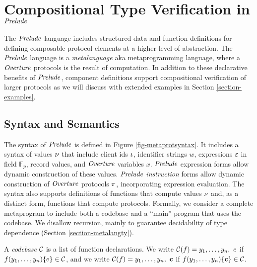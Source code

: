 \section{Compositional Type Verification in $\mathit{Prelude}$}
\label{section-metalang}

The $\mathit{Prelude}$ language \cite{skalka-near-ppdp24} includes structured
data and function definitions for defining composable protocol
elements at a higher level of abstraction.  The $\mathit{Prelude}$ language
is a \emph{metalanguage} aka metaprogramming language, where a
$\mathit{Overture}$ protocols is the result of computation. In addition to
these declarative benefits of $\mathit{Prelude}$, component definitions
support compositional verification of larger protocols as we will
discuss with extended examples in Section \ref{section-examples}.

\metaprotsyntaxfig

\subsection{Syntax and Semantics}

The syntax of $\mathit{Prelude}$ is defined in Figure
\ref{fig-metaprotsyntax}.  It includes a syntax of values $\nu$ that
include client ids $\iota$, identifier strings $w$, expressions $\varepsilon$
in field $\mathbb{F}_p$, record values, and $\mathit{Overture}$ variables
$x$. $\mathit{Prelude}$ expression forms allow dynamic construction of these
values. $\mathit{Prelude}$ \emph{instruction} forms allow dynamic
construction of $\mathit{Overture}$ protocols $\pi$, incorporating expression
evaluation. The syntax also supports definitions of functions that
compute values $\nu$ and, as a distinct form, functions that compute
protocols.  Formally, we consider a complete metaprogram to include
both a codebase and a ``main'' program that uses the codebase.
We disallow recursion, mainly to guarantee decidability
of type dependence (Section \ref{section-metalangty}).
\begin{definition}
A \emph{codebase} $\mathcal{C}$ is a list of function 
declarations. We write $ \mathcal{C}(f) = y_1,\ldots,y_n,\ e$
if $f(y_1,\ldots,y_n) \{ e \} \in \mathcal{C}$, and we
write  $ \codebase(f) = y_1,\ldots,y_n,\ \instr$
if $f(y_1,\ldots,y_n) \{ \mathbf{c} \} \in \mathcal{C}$.
\end{definition}

\metaprotexprsemanticsfig

